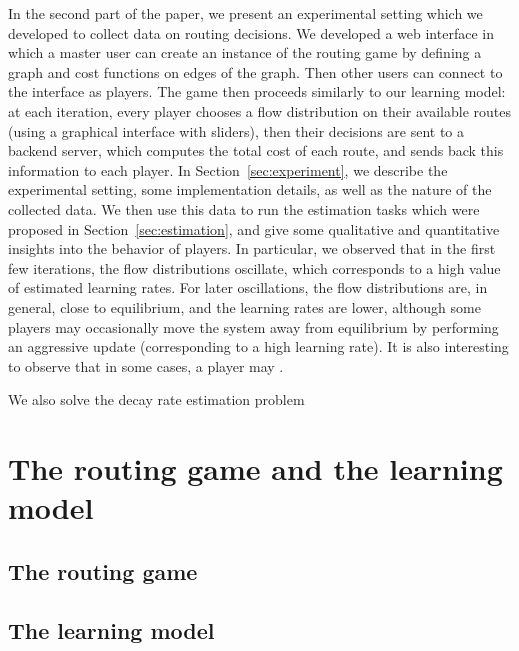 \documentclass{sig-alternate-ipsn13}
\begin{document}
In the second part of the paper, we present an experimental setting which we developed to collect data on routing decisions. We developed a web interface in which a master user can create an instance of the routing game by defining a graph and cost functions on edges of the graph. Then other users can connect to the interface as players. The game then proceeds similarly to our learning model: at each iteration, every player chooses a flow distribution on their available routes (using a graphical interface with sliders), then their decisions are sent to a backend server, which computes the total cost of each route, and sends back this information to each player. In Section~\ref{sec:experiment}, we describe the experimental setting, some implementation details, as well as the nature of the collected data. We then use this data to run the estimation tasks which were proposed in Section~\ref{sec:estimation}, and give some qualitative and quantitative insights into the behavior of players. In particular, we observed that in the first few iterations, the flow distributions oscillate, which corresponds to a high value of estimated learning rates. For later oscillations, the flow distributions are, in general, close to equilibrium, and the learning rates are lower, although some players may occasionally move the system away from equilibrium by performing an aggressive update (corresponding to a high learning rate). It is also interesting to observe that in some cases, a player may .

We also solve the decay rate estimation problem

\section{The routing game and the learning model}
\label{sec:model}

\subsection{The routing game}
\label{sec:routing_game}




\subsection{The learning model}
\label{sec:learning}
\end{document}
